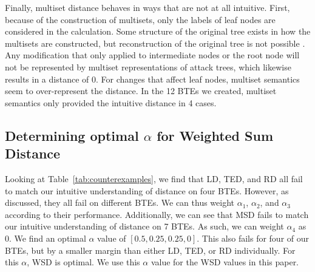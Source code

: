 Finally, multiset distance behaves in ways that are not at all intuitive. First, because of the construction of multisets, only the labels of leaf nodes are considered in the calculation. Some structure of the original tree exists in how the multisets are constructed, but reconstruction of the original tree is not possible \cite{mauw_foundations_2006}. Any modification that only applied to intermediate nodes or the root node will not be represented by multiset representations of attack trees, which likewise results in a distance of 0. For changes that affect leaf nodes, multiset semantics seem to over-represent the distance. In the 12 BTEs we created, multiset semantics only provided the intuitive distance in 4 cases.

\subsection{Determining optimal $\alpha$ for Weighted Sum Distance}
\label{ssec:results-alpha}

Looking at Table~\ref{tab:counterexamples}, we find that LD, TED, and RD all fail to match our intuitive understanding of distance on four BTEs. However, as discussed, they all fail on different BTEs. We can thus weight $\alpha_1$, $\alpha_2$, and $\alpha_3$ according to their performance. Additionally, we can see that MSD fails to match our intuitive understanding of distance on 7 BTEs. As such, we can weight $\alpha_4$ as 0. We find an optimal $\alpha$ value of $[0.5, 0.25, 0.25, 0]$. This also fails for four of our BTEs, but by a smaller margin than either LD, TED, or RD individually. For this $\alpha$, WSD is optimal. We use this $\alpha$ value for the WSD values in this paper.















